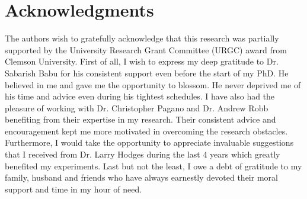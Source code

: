 \chapter*{Acknowledgments}

The authors wish to gratefully acknowledge that this research was partially supported by the University Research Grant Committee (URGC) award from Clemson University.
First of all, I wish to express my deep gratitude to Dr. Sabarish Babu for his consistent support even before the start of my PhD. He believed in me and gave me the opportunity to blossom. He never deprived me of his time and advice even during his tightest schedules. I have also had the pleasure of working with Dr. Christopher Pagano and Dr. Andrew Robb benefiting from their expertise in my research. Their consistent advice and encouragement kept me more motivated in overcoming the research obstacles. Furthermore, I would take the opportunity to appreciate invaluable suggestions that I received from Dr. Larry Hodges during the last 4 years which greatly benefited my experiments. Last but not the least, I owe a debt of gratitude to my family, husband and friends who have always earnestly devoted their moral support and time in my hour of need.


